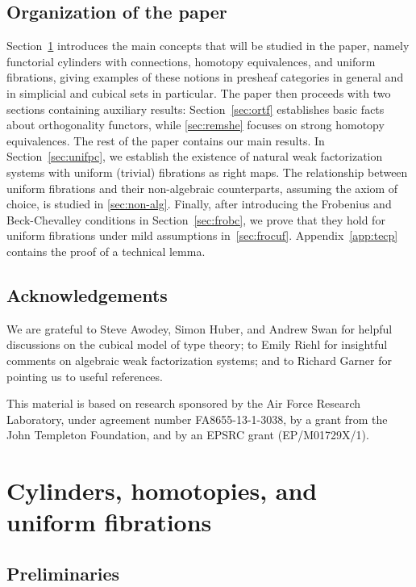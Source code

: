 \documentclass[reqno,10pt,a4paper,oneside,draft]{amsart}
\begin{document}
\subsection*{Organization of the paper}
Section~\ref{sec:cylhuf} introduces the main concepts that will be studied in the paper, namely functorial cylinders with connections, homotopy equivalences, and uniform fibrations, giving examples of these notions in presheaf categories in general and in simplicial and cubical sets in particular.
The paper then proceeds with two sections containing auxiliary results: Section~\ref{sec:ortf} establishes basic facts about orthogonality functors, while \cref{sec:remshe} focuses on strong homotopy equivalences.
The rest of the paper contains our main results.
In Section~\ref{sec:unifpc}, we establish  the existence of natural weak factorization systems with uniform (trivial) fibrations as right maps. The relationship between uniform fibrations and their non-algebraic counterparts, assuming the axiom of choice, is studied in \cref{sec:non-alg}.
Finally, after introducing the Frobenius and Beck-Chevalley conditions in Section~\ref{sec:frobc}, we prove that they hold for uniform fibrations under mild assumptions in~\cref{sec:frocuf}.
Appendix~\ref{app:tecp} contains the proof of a technical lemma. 

\subsection*{Acknowledgements} We are grateful to Steve Awodey, Simon Huber, and Andrew Swan for helpful discussions on the cubical model of type theory; to Emily Riehl for insightful comments on algebraic weak factorization systems; and to Richard Garner for pointing us to useful references.

This material is based on research sponsored by the Air Force Research Laboratory, under agreement number FA8655-13-1-3038, by a grant from the John Templeton Foundation, and by an EPSRC grant (EP/M01729X/1).


\section{Cylinders, homotopies, and uniform fibrations}
\label{sec:cylhuf}

\subsection*{Preliminaries}
\end{document}
